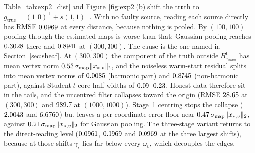 \documentclass[11pt,a4paper]{article}
\theoremstyle{definition}
\theoremstyle{remark}
\begin{document}
Table~\ref{tab:exp2_dist} and Figure~\ref{fig:exp2}(b) shift the truth to $g_{\mathrm{true}} = (1,0)^\top + s(1,1)^\top$. With no faulty source, reading each source directly has RMSE $0.0969$ at every distance, because nothing is pooled. By $(100,100)$ pooling through the estimated maps is worse than that: Gaussian pooling reaches $0.3028$ there and $0.8941$ at $(300,300)$. The cause is the one named in Section~\ref{sec:sheaf}. At $(300,300)$ the component of the truth outside $H^0_{\tau_{\mathrm{harm}}}$ has mean vertex norm $0.53\,\sigma_{\mathrm{map}}\|x_{*,v}\|_2$, and the noiseless warm-start residual splits into mean vertex norms of $0.0085$ (harmonic part) and $0.8745$ (non-harmonic part), against Student-$t$ core half-widths of $0.09$--$0.23$. Honest data therefore sit in the tails, and the uncentred filter collapses toward the origin (RMSE $28.65$ at $(300,300)$ and $989.7$ at $(1000,1000)$). Stage~1 centring stops the collapse ($2.0043$ and $6.6760$) but leaves a per-coordinate error floor near $0.47\,\sigma_{\mathrm{map}}\|x_{*,v}\|_2$, against $0.21\,\sigma_{\mathrm{map}}\|x_{*,v}\|_2$ for Gaussian pooling. The three-stage variant returns to the direct-reading level ($0.0961$, $0.0969$ and $0.0969$ at the three largest shifts), because at those shifts $\gamma_\epsilon$ lies far below every $\bar{\omega}_v$, which decouples the edges.
\end{document}
